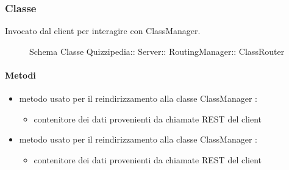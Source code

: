 \subsubsection{Classe }
Invocato dal client per interagire con ClassManager.
\begin{figure}[H]
\centering
\noindent{}
\caption[Schema Classe ClassRouter]{Schema Classe Quizzipedia:: Server:: RoutingManager:: ClassRouter}
\end{figure}
\paragraph{Metodi}
\begin{itemize}
\item {}
\newline
metodo usato per il reindirizzamento alla classe ClassManager
\newline
{} :
\begin{itemize}
\item {}
\newline
contenitore dei dati provenienti da chiamate REST del client
\end{itemize}
\item {}
\newline
metodo usato per il reindirizzamento alla classe ClassManager
\newline
{} :
\begin{itemize}
\item {}
\newline
contenitore dei dati provenienti da chiamate REST del client
\end{itemize}
\end{itemize}

